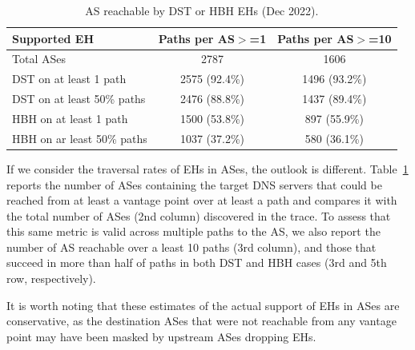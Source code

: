\documentclass[conference]{IEEEtran}
\begin{document}
\begin{table}
\caption{AS reachable by DST or HBH EHs (Dec 2022).}
\begin{tabular}{l|c|c}
Supported EH                & Paths per AS$>$=1 & Paths per AS$>$=10 \\
\hline \hline
Total  ASes                 & 2787              & 1606 \\
\hline
DST on at least 1 path      & 2575 (92.4\%)     & 1496 (93.2\%)      \\
DST on at least 50\% paths  & 2476 (88.8\%)     & 1437 (89.4\%)      \\ \hline
HBH on at least 1 path      & 1500 (53.8\%)      & 897 (55.9\%)      \\
HBH on ar least 50\% paths  & 1037 (37.2\%)      & 580 (36.1\%)  
\end{tabular}
\label{tbl:as_pathspider}
\end{table}

If we consider the traversal rates of EHs in ASes, the outlook is different.
Table~\ref{tbl:as_pathspider} reports the  number of ASes containing the target
DNS servers that could be reached from at least a vantage point over at least a
path and compares it with the total number of ASes (2nd column) discovered in
the trace. To assess that this same metric is valid across multiple paths to
the AS, we also report the number of AS reachable over a least 10 paths (3rd
column), and those that succeed in more than half of paths in both DST and HBH
cases (3rd and 5th row, respectively).



It is worth noting that these estimates of the actual support of EHs in ASes
are conservative, as the destination ASes that were not reachable from any
vantage point may have been masked by upstream ASes dropping EHs.

\end{document}

